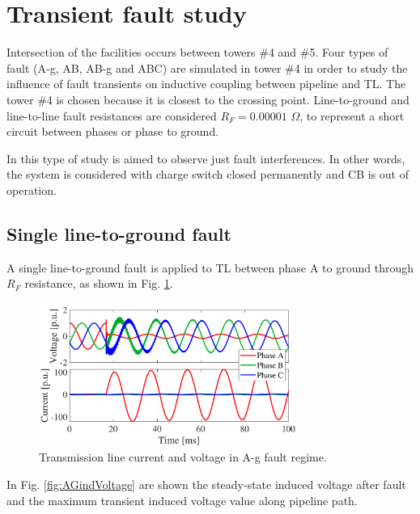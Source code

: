 \documentclass[5p,twocolumn]{elsarticle}
\begin{document}
\section{Transient fault study}

Intersection of the facilities occurs between towers \#4 and \#5. Four types of fault (A-g, AB, AB-g and ABC) are simulated in tower \#4 in order to study the influence of fault transients on inductive coupling between pipeline and TL. The tower \#4 is chosen because it is closest to the crossing point. Line-to-ground and line-to-line fault resistances are considered $R_{F} = 0.00001$ $\Omega$, to represent a short circuit between phases or phase to ground.

In this type of study is aimed to observe just fault interferences. In other words, the system is considered with charge switch closed permanently and CB is out of operation. 

\subsection{Single line-to-ground fault}

A single line-to-ground fault is applied to TL between phase A to ground through $R_{F}$ resistance, as shown in Fig. \ref{fig:AGindVoltageTL}. 

\begin{figure}[h]
	\begin{center}
		\includegraphics[width=8.4cm]{img/AGindVoltage_TL.pdf}    %
		\caption{Transmission line current and voltage in A-g fault regime.} 
		\label{fig:AGindVoltageTL}
	\end{center}
\end{figure} 

In Fig. \ref{fig:AGindVoltage} are shown the steady-state induced voltage after fault and the maximum transient induced voltage value along pipeline path.
\end{document}
